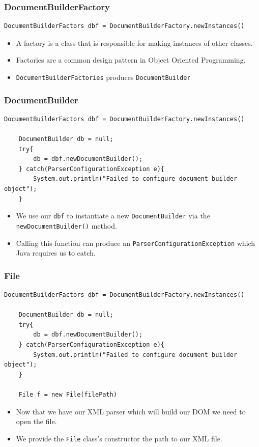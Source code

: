 \documentclass{beamer}
\begin{document}
\begin{frame}[fragile]
    \frametitle{DocumentBuilderFactory}
    \begin{lstlisting}[basicstyle=\tiny]
    DocumentBuilderFactors dbf = DocumentBuilderFactory.newInstances()
    \end{lstlisting}
    \begin{itemize}
        \item A factory is a class that is responsible for making instances of other classes.
        \item Factories are a common design pattern in Object Oriented Programming.
        \item \lstinline|DocumentBuilderFactories| produces \lstinline|DocumentBuilder|
    \end{itemize}
\end{frame}

\begin{frame}[fragile]
    \frametitle{DocumentBuilder}
    \begin{lstlisting}[basicstyle=\tiny]
    DocumentBuilderFactors dbf = DocumentBuilderFactory.newInstances()

    DocumentBuilder db = null;
    try{
        db = dbf.newDocumentBuilder();
    } catch(ParserConfigurationException e){
        System.out.println("Failed to configure document builder object");
    }
    \end{lstlisting}
    \begin{itemize}
        \item We use our \lstinline|dbf| to instantiate a new \lstinline|DocumentBuilder| via the \lstinline|newDocumentBuilder()| method.
        \item Calling this function can produce an \lstinline|ParserConfigurationException| which Java requires us to catch.
    \end{itemize}
\end{frame}

\begin{frame}[fragile]
    \frametitle{File}
    \begin{lstlisting}[basicstyle=\tiny]
    DocumentBuilderFactors dbf = DocumentBuilderFactory.newInstances()

    DocumentBuilder db = null;
    try{
        db = dbf.newDocumentBuilder();
    } catch(ParserConfigurationException e){
        System.out.println("Failed to configure document builder object");
    }

    File f = new File(filePath)
    \end{lstlisting}
    \begin{itemize}
        \item Now that we have our XML parser which will build our DOM we need to open the file.
        \item We provide the \lstinline|File| class's constructor the path to our XML file.
    \end{itemize}
\end{frame}
\end{document}
